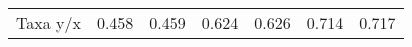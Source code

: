 \begin{table}[]
\begin{tabular}{ccccccc}
Taxa y/x                                                                                                                   & 0.458                            & 0.459                                      & 0.624                            & 0.626                                      & 0.714                            & 0.717                                     
\end{tabular}
\end{table}
